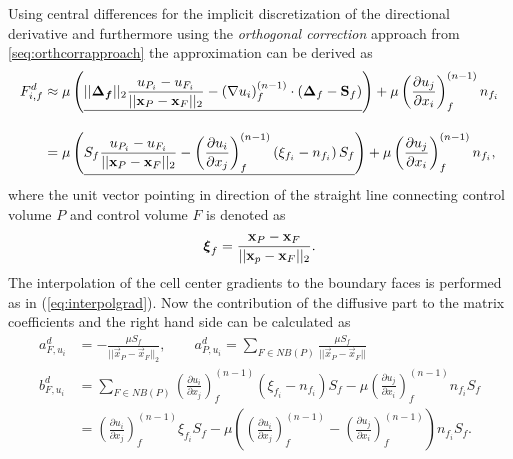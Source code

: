       Using central differences for the implicit discretization of the directional derivative and furthermore using the \emph{orthogonal correction} approach from \ref{seq:orthcorrapproach} the approximation can be derived as
      \begin{align*}
        F_{i,f}^d 
        &\approx 
        \mu \left( \underline{||\boldsymbol{\boldsymbol{\Delta}_f}||_2 \frac{u_{P_i} - u_{F_i}}{ || \mathbf{x}_P - \mathbf{x}_F ||_2 }  
        -  \left(\nabla u_i \right)_f^{(n-1)} \cdot \left(\boldsymbol{\Delta}_f - \mathbf{S}_f\right)  }  \right)
        + \mu \left( \frac{\partial u_j}{\partial x_i} \right)_f^{(n-1)} n_{f_i} \\[1em]
        &= \mu \left(\underline{  S_f \frac{u_{P_i} - u_{F_i}}{ || \mathbf{x}_P - \mathbf{x}_F ||_2 }  
    - \left( \frac{\partial u_i}{\partial x_j}\right)_f^{(n-1)} \left(\xi_{f_i} - n_{f_i}\right)S_f  } \right)
      + \mu \left( \frac{\partial u_j}{\partial x_i} \right)_f^{(n-1)} n_{f_i},
    \end{align*}
      where the unit vector pointing in direction of the straight line connecting control volume \(P\) and control volume \(F\) is denoted as
      \begin{displaymath}
        \boldsymbol{\xi}_f = \frac{\mathbf{x}_P - \mathbf{x}_F}{|| \mathbf{x}_p - \mathbf{x}_F ||_2}.
      \end{displaymath}
      The interpolation of the cell center gradients to the boundary faces is performed as in (\ref{eq:interpolgrad}). Now the contribution of the diffusive part to the matrix coefficients and the right hand side can be calculated as
      \begin{subequations}
        \begin{align}
          a_{F,u_i}^d &= - \frac{\mu S_f}{||\vec{x}_P - \vec{x}_F||_2}, 
          \quad \quad a_{P,u_i}^d = \sum_{F \in NB(P)} \frac{\mu S_f}{|| \vec{x}_P - \vec{x}_F ||} \\[1em]
          b_{F,u_i}^d &=  \sum_{F \in NB(P)} \left( \frac{\partial u_i}{\partial x_j}\right)_f^{(n-1)} \left(\xi_{f_i} - n_{f_i}\right)S_f  
          - \mu \left( \frac{\partial u_j}{\partial x_i} \right)_f^{(n-1)} n_{f_i} S_f   \nonumber \\[0.5em]
          &=   \left( \frac{\partial u_i}{\partial x_j}\right)_f^{(n-1)} \xi_{f_i} S_f
          - \mu \left( \left( \frac{\partial u_i}{\partial x_j} \right)_f^{(n-1)}
          - \left( \frac{\partial u_j}{\partial x_i} \right)_f^{(n-1)} \right) n_{f_i} S_f.
        \end{align}
      \end{subequations}

